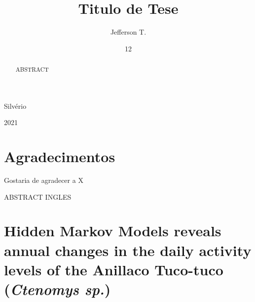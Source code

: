 \documentclass[english,msc,numbers,hidelinks]{coppe}
\begin{document}
  \title{Titulo de Tese}
    \author{Jefferson T.}{Silvério}
  

  \date{12}{2021}
    
  \maketitle

  \frontmatter
  
  \dedication{``O sol afundou mais um pouco. As sombras se alongaram, atravessando a caldeira de sal. Linhas de cores vibrantes espalharam-se sobre o horizonte do poente. A cor foi se transformando num dedo de trevas a experimentar a areia. As sombras cor de carvão se alastraram, e o desmoronamento compacto da noite obliterou o deserto.'' \linebreak \textnormal{— Frank Herbert, Duna.}}
  
    \chapter*{Agradecimentos}
  Gostaria de agradecer a X
  
  \begin{abstract}
  ABSTRACT
  \end{abstract}
  \pagebreak
  \begin{foreignabstract}
  ABSTRACT INGLES
  \end{foreignabstract}
  \tableofcontents
  
  
  
  \printlosymbols
  \printloabbreviations

  \mainmatter
  \hypertarget{hidden-markov-models-reveals-annual-changes-in-the-daily-activity-levels-of-the-anillaco-tuco-tuco-ctenomys-sp.}{%
  \chapter{\texorpdfstring{Hidden Markov Models reveals annual changes in the daily activity levels of the Anillaco Tuco-tuco (\emph{Ctenomys sp.})}{Hidden Markov Models reveals annual changes in the daily activity levels of the Anillaco Tuco-tuco (Ctenomys sp.)}}\label{hidden-markov-models-reveals-annual-changes-in-the-daily-activity-levels-of-the-anillaco-tuco-tuco-ctenomys-sp.}}
\end{document}

